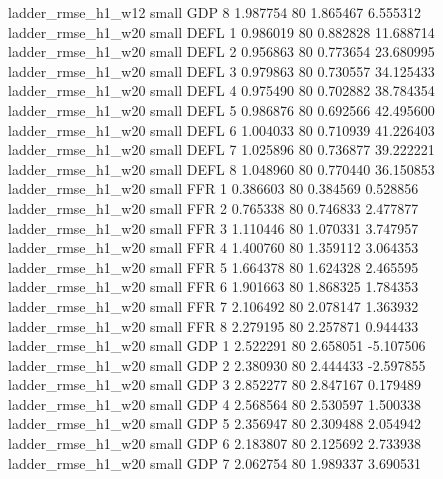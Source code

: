       ladder_rmse_h1_w12      small      GDP                 8 1.987754 80       1.865467           6.555312
      ladder_rmse_h1_w20      small     DEFL                 1 0.986019 80       0.882828          11.688714
      ladder_rmse_h1_w20      small     DEFL                 2 0.956863 80       0.773654          23.680995
      ladder_rmse_h1_w20      small     DEFL                 3 0.979863 80       0.730557          34.125433
      ladder_rmse_h1_w20      small     DEFL                 4 0.975490 80       0.702882          38.784354
      ladder_rmse_h1_w20      small     DEFL                 5 0.986876 80       0.692566          42.495600
      ladder_rmse_h1_w20      small     DEFL                 6 1.004033 80       0.710939          41.226403
      ladder_rmse_h1_w20      small     DEFL                 7 1.025896 80       0.736877          39.222221
      ladder_rmse_h1_w20      small     DEFL                 8 1.048960 80       0.770440          36.150853
      ladder_rmse_h1_w20      small      FFR                 1 0.386603 80       0.384569           0.528856
      ladder_rmse_h1_w20      small      FFR                 2 0.765338 80       0.746833           2.477877
      ladder_rmse_h1_w20      small      FFR                 3 1.110446 80       1.070331           3.747957
      ladder_rmse_h1_w20      small      FFR                 4 1.400760 80       1.359112           3.064353
      ladder_rmse_h1_w20      small      FFR                 5 1.664378 80       1.624328           2.465595
      ladder_rmse_h1_w20      small      FFR                 6 1.901663 80       1.868325           1.784353
      ladder_rmse_h1_w20      small      FFR                 7 2.106492 80       2.078147           1.363932
      ladder_rmse_h1_w20      small      FFR                 8 2.279195 80       2.257871           0.944433
      ladder_rmse_h1_w20      small      GDP                 1 2.522291 80       2.658051          -5.107506
      ladder_rmse_h1_w20      small      GDP                 2 2.380930 80       2.444433          -2.597855
      ladder_rmse_h1_w20      small      GDP                 3 2.852277 80       2.847167           0.179489
      ladder_rmse_h1_w20      small      GDP                 4 2.568564 80       2.530597           1.500338
      ladder_rmse_h1_w20      small      GDP                 5 2.356947 80       2.309488           2.054942
      ladder_rmse_h1_w20      small      GDP                 6 2.183807 80       2.125692           2.733938
      ladder_rmse_h1_w20      small      GDP                 7 2.062754 80       1.989337           3.690531
